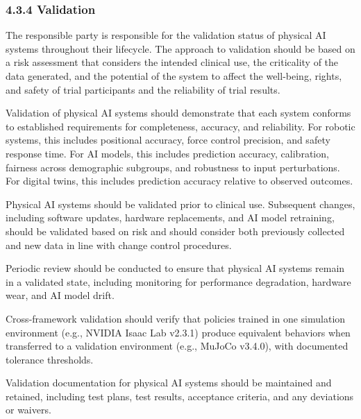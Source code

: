 \documentclass[11pt]{article}
\begin{document}
\subsubsection{4.3.4 Validation}

\begin{description}[leftmargin=2.5cm,style=sameline]

\item[(a)] The responsible party is responsible for the validation status of physical AI systems throughout their lifecycle. The approach to validation should be based on a risk assessment that considers the intended clinical use, the criticality of the data generated, and the potential of the system to affect the well-being, rights, and safety of trial participants and the reliability of trial results.

\item[(b)] Validation of physical AI systems should demonstrate that each system conforms to established requirements for completeness, accuracy, and reliability. For robotic systems, this includes positional accuracy, force control precision, and safety response time. For AI models, this includes prediction accuracy, calibration, fairness across demographic subgroups, and robustness to input perturbations. For digital twins, this includes prediction accuracy relative to observed outcomes.

\item[(c)] Physical AI systems should be validated prior to clinical use. Subsequent changes, including software updates, hardware replacements, and AI model retraining, should be validated based on risk and should consider both previously collected and new data in line with change control procedures.

\item[(d)] Periodic review should be conducted to ensure that physical AI systems remain in a validated state, including monitoring for performance degradation, hardware wear, and AI model drift.

\item[(e)] Cross-framework validation should verify that policies trained in one simulation environment (e.g., NVIDIA Isaac Lab v2.3.1) produce equivalent behaviors when transferred to a validation environment (e.g., MuJoCo v3.4.0), with documented tolerance thresholds.

\item[(f)] Validation documentation for physical AI systems should be maintained and retained, including test plans, test results, acceptance criteria, and any deviations or waivers.

\end{description}
\end{document}
